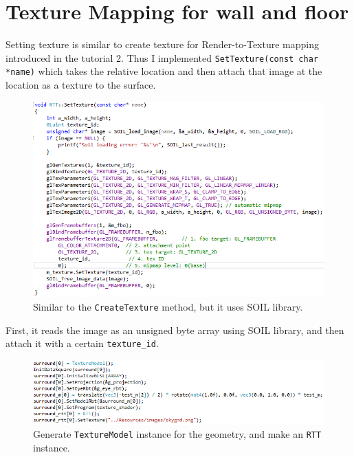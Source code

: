 \documentclass[11pt]{article}
\begin{document}
\section{Texture Mapping for wall and floor} \label{sec:2}
Setting texture is similar to create texture for Render-to-Texture mapping introduced in the tutorial 2. Thus I implemented \texttt{SetTexture(const char *name)} which takes the relative location and then attach that image at the location as a texture to the surface.
\begin{figure}[htb]
	\begin{center}
		\includegraphics[width=0.7\linewidth]{rttSetTexture.png}
	\end{center}
	\caption{Similar to the \texttt{CreateTexture} method, but it uses SOIL library.}
\end{figure}
First, it reads the image as an unsigned byte array using SOIL library, and then attach it with a certain \texttt{texture\_id}.
\newpage
\begin{figure}[htb]
	\begin{center}
		\includegraphics[width=1.0\linewidth]{mainSurround.png}
	\end{center}
	\caption{Generate \texttt{TextureModel} instance for the geometry, and make an \texttt{RTT} instance.}
\end{figure}
\end{document}
